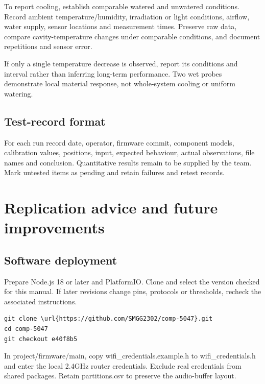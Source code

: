 \documentclass[10pt,a4paper]{article}
\begin{document}
To report cooling, establish comparable watered and unwatered conditions. Record ambient temperature/humidity, irradiation or light conditions, airflow, water supply, sensor locations and measurement times. Preserve raw data, compare cavity-temperature changes under comparable conditions, and document repetitions and sensor error.


If only a single temperature decrease is observed, report its conditions and interval rather than inferring long-term performance. Two wet probes demonstrate local material response, not whole-system cooling or uniform watering.


\subsection{Test-record format}

For each run record date, operator, firmware commit, component models, calibration values, positions, input, expected behaviour, actual observations, file names and conclusion. Quantitative results remain to be supplied by the team. Mark untested items as pending and retain failures and retest records.



\section{Replication advice and future improvements}

\subsection{Software deployment}

Prepare Node.js 18 or later and PlatformIO. Clone and select the version checked for this manual. If later revisions change pins, protocols or thresholds, recheck the associated instructions.


\begingroup\small\begin{verbatim}
git clone \url{https://github.com/SMGG2302/comp-5047}.git
cd comp-5047
git checkout e40f8b5
\end{verbatim}\endgroup

In project/firmware/main, copy wifi\_credentials.example.h to wifi\_credentials.h and enter the local 2.4GHz router credentials. Exclude real credentials from shared packages. Retain partitions.csv to preserve the audio-buffer layout.
\end{document}
